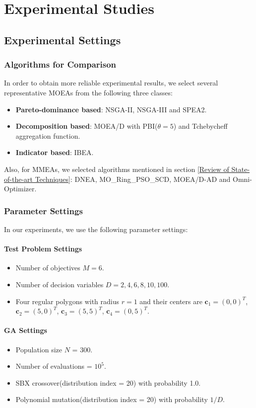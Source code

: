 \documentclass[conference]{IEEEtran}
\begin{document}
\section{Experimental Studies}
\label{Experimental Studies}
\subsection{Experimental Settings}
\label{Experimental Settings}
\subsubsection{Algorithms for Comparison}
In order to obtain more reliable experimental results, we select several representative MOEAs from the following three classes:
\begin{itemize}
    \item \textbf{Pareto-dominance based}: NSGA-II\cite{deb2002fast}, NSGA-III\cite{deb2013evolutionary} and SPEA2\cite{zitzler2001spea2}.
    \item \textbf{Decomposition based}: MOEA/D \cite{zhang2007moea} with PBI($\theta=5$) and Tchebycheff aggregation function.
    \item \textbf{Indicator based}: IBEA\cite{zitzler2004indicator}.
\end{itemize}

Also, for MMEAs, we selected algorithms mentioned in section \ref{Review of State-of-the-art Techniques}: DNEA, MO\_Ring\_PSO\_SCD, MOEA/D-AD and Omni-Optimizer.
\subsubsection{Parameter Settings}
In our experiments, we use the following parameter settings: 
\paragraph{Test Problem Settings}
\begin{itemize}
     \item Number of objectives $M=6$.
    \item Number of decision variables $D=2, 4, 6, 8, 10, 100$.
    \item Four regular polygons with radius $r=1$ and their centers are $\boldsymbol{c}_1=(0, 0)^T$, $\boldsymbol{c}_2=(5, 0)^T$, $\boldsymbol{c}_3=(5, 5)^T$, $\boldsymbol{c}_4=(0, 5)^T$. 
\end{itemize}
\paragraph{GA Settings}
\begin{itemize}
    \item Population size $N$ = 300.
    \item Number of evaluations = $10^5$.
    \item SBX crossover(distribution index = 20) with probability 1.0.
    \item Polynomial mutation(distribution index = 20) with probability $1/D$.
\end{itemize}
\end{document}
